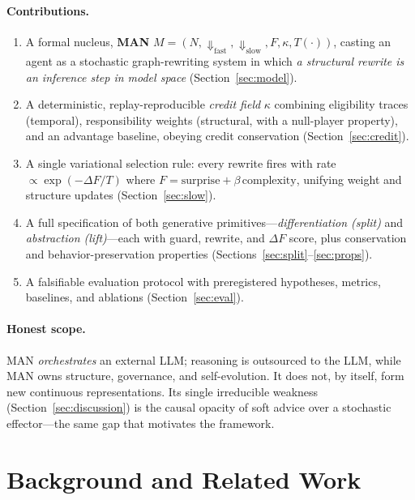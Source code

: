\documentclass[11pt]{article}
\theoremstyle{definition}
\begin{document}
\paragraph{Contributions.}
\begin{enumerate}[leftmargin=1.4em,itemsep=2pt]
\item A formal nucleus, \textbf{MAN}
  $M=(N,\Downarrow_\text{fast},\Downarrow_\text{slow},F,\kappa,T(\cdot))$,
  casting an agent as a stochastic graph-rewriting system in which
  \emph{a structural rewrite is an inference step in model space}
  (Section~\ref{sec:model}).
\item A deterministic, replay-reproducible \emph{credit field} $\kappa$
  combining eligibility traces (temporal), responsibility weights
  (structural, with a null-player property), and an advantage baseline,
  obeying credit conservation (Section~\ref{sec:credit}).
\item A single variational selection rule: every rewrite fires with rate
  $\propto\exp(-\Delta F/T)$ where $F=\text{surprise}+\beta\,\text{complexity}$,
  unifying weight and structure updates (Section~\ref{sec:slow}).
\item A full specification of both generative primitives---\emph{differentiation
  (split)} and \emph{abstraction (lift)}---each with guard, rewrite, and
  $\Delta F$ score, plus conservation and behavior-preservation properties
  (Sections~\ref{sec:split}--\ref{sec:props}).
\item A falsifiable evaluation protocol with preregistered hypotheses,
  metrics, baselines, and ablations (Section~\ref{sec:eval}).
\end{enumerate}

\paragraph{Honest scope.}
MAN \emph{orchestrates} an external LLM; reasoning is outsourced to the LLM,
while MAN owns structure, governance, and self-evolution. It does not, by
itself, form new continuous representations. Its single irreducible weakness
(Section~\ref{sec:discussion}) is the causal opacity of soft advice over a
stochastic effector---the same gap that motivates the framework.

\section{Background and Related Work}
\end{document}
